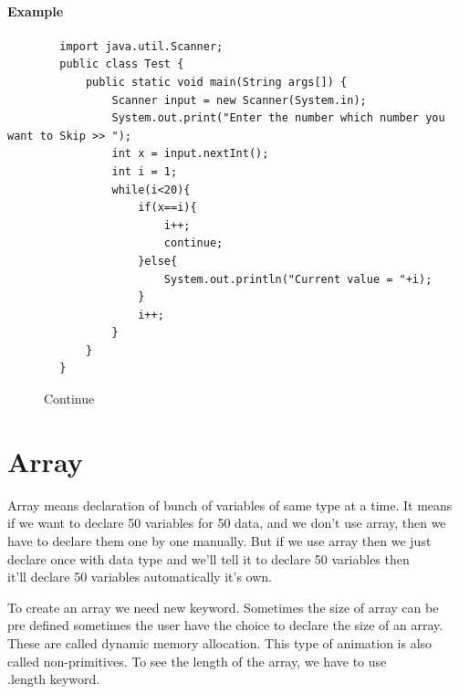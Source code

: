 \documentclass[openany]{book}  %
\begin{document}
\subsubsection{Example}
\begin{center}
    \footnotesize
    \begin{verbatim}
        import java.util.Scanner;
        public class Test {
            public static void main(String args[]) {
                Scanner input = new Scanner(System.in);
                System.out.print("Enter the number which number you want to Skip >> ");
                int x = input.nextInt();
                int i = 1;
                while(i<20){
                    if(x==i){
                        i++;
                        continue;
                    }else{
                        System.out.println("Current value = "+i);
                    }
                    i++;
                }
            }
        }
    \end{verbatim}
\end{center}
% 
% 
\begin{figure}[htbp]
    \begin{center}
        \caption{Continue}
    \end{center}
\end{figure}


% 
% 
\chapter{Array}
Array means declaration of bunch of variables of same type at a time. It means \\
if we want to declare 50 variables for 50 data, and we don't use array, then we \\
have to declare them one by one manually. But if we use array then we just \\
declare once with data type and we'll tell it to declare 50 variables then \\
it'll declare 50 variables automatically it's own. \linebreak

To create an array we need new keyword. Sometimes the size of array can be \\
pre defined sometimes the user have the choice to declare the size of an array. \\
These are called dynamic memory allocation. This type of animation is also \\
called non-primitives. To see the length of the array, we have to use \\
.length keyword.
% 
%  
\end{document}
